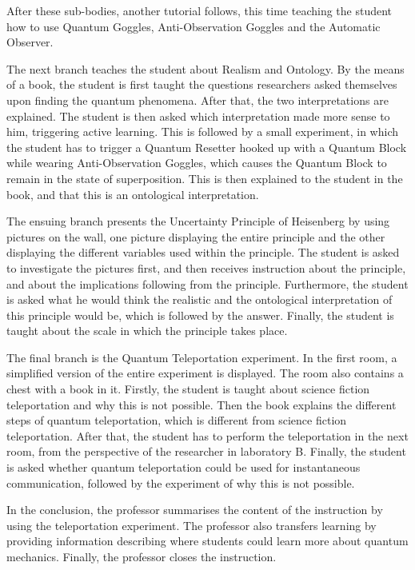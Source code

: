 \documentclass[11pt,twoside]{report} %
\begin{document}
After these sub-bodies, another tutorial follows, this time teaching the student how to use Quantum Goggles, Anti-Observation Goggles and the Automatic Observer.

The next branch teaches the student about Realism and Ontology. By the means of a book, the student is first taught the questions researchers asked themselves upon finding the quantum phenomena. After that, the two interpretations are explained. The student is then asked which interpretation made more sense to him, triggering active learning. This is followed by a small experiment, in which the student has to trigger a Quantum Resetter hooked up with a Quantum Block while wearing Anti-Observation Goggles, which causes the Quantum Block to remain in the state of superposition. This is then explained to the student in the book, and that this is an ontological interpretation.

The ensuing branch presents the Uncertainty Principle of Heisenberg by using pictures on the wall, one picture displaying the entire principle and the other displaying the different variables used within the principle. The student is asked to investigate the pictures first, and then receives instruction about the principle, and about the implications following from the principle. Furthermore, the student is asked what he would think the realistic and the ontological interpretation of this principle would be, which is followed by the answer. Finally, the student is taught about the scale in which the principle takes place.

The final branch is the Quantum Teleportation experiment. In the first room, a simplified version of the entire experiment is displayed. The room also contains a chest with a book in it. Firstly, the student is taught about science fiction teleportation and why this is not possible. Then the book explains the different steps of quantum teleportation, which is different from science fiction teleportation. After that, the student has to perform the teleportation in the next room, from the perspective of the researcher in laboratory B. Finally, the student is asked whether quantum teleportation could be used for instantaneous communication, followed by the experiment of why this is not possible.

In the conclusion, the professor summarises the content of the instruction by using the teleportation experiment. The professor also transfers learning by providing information describing where students could learn more about quantum mechanics. Finally, the professor closes the instruction.
\end{document}
